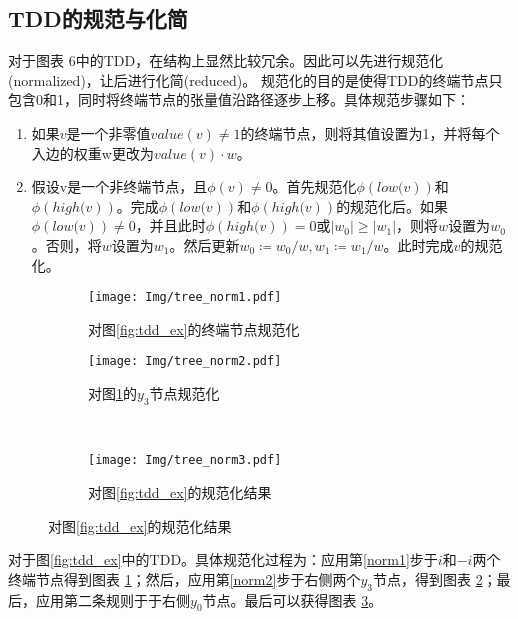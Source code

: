 \subsection{TDD的规范与化简}
对于图表 6中的TDD，在结构上显然比较冗余。因此可以先进行规范化(normalized)，让后进行化简(reduced)\citep{Hong_2022}。
规范化的目的是使得TDD的终端节点只包含0和1，同时将终端节点的张量值沿路径逐步上移。具体规范步骤如下：
\begin{enumerate}
    \item 如果$v$是一个非零值$value\left(v\right)\neq 1$的终端节点，则将其值设置为1，并将每个入边的权重w更改为$value\left(v\right)\cdot w$。\label{norm1}
    \item 假设v是一个非终端节点，且$\phi\left(v\right)\neq 0$。首先规范化$\phi\left.\left(low(v\right)\right)$和$\phi\left.\left(high(v\right)\right)$。完成$\phi\left.\left(low(v\right)\right)$和$\phi\left.\left(high(v\right)\right)$的规范化后。如果$\phi\left.\left(low(v\right)\right)\neq 0$，并且此时$\phi\left.\left(high(v\right)\right)=0$或$\left|w_0\right|\geq\left|w_1\right|$，则将$w$设置为$w_0$。否则，将$w$设置为$w_1$。然后更新$w_0≔w_0/w,w_1≔w_1/w$。此时完成$v$的规范化。\label{norm2}
\end{enumerate}

\begin{figure}[!htbp]
    \centering
    \begin{subfigure}[b]{0.4\textwidth}
        \centering
        \texttt{[image: Img/tree\_norm1.pdf]}
        \caption{对图\ref{fig:tdd_ex}的终端节点规范化}
        \label{fig:tdd-norma}
    \end{subfigure}
    \begin{subfigure}[b]{0.4\textwidth}
        \centering
        \texttt{[image: Img/tree\_norm2.pdf]}
        \caption{对图\ref{fig:tdd-norma}的$y_3$节点规范化}
        \label{fig:tdd-normb}
    \end{subfigure}
    \\
    \begin{subfigure}[b]{0.8\textwidth}
        \centering
        \texttt{[image: Img/tree\_norm3.pdf]}
        \caption{对图\ref{fig:tdd_ex}的规范化结果}
        \label{fig:tdd-normc}
    \end{subfigure}
    \label{fig:tdd-norm}
\end{figure}
对于图\ref{fig:tdd_ex}中的TDD。具体规范化过程为：应用第\ref{norm1}步于$i$和$-i$两个终端节点得到图表 \ref{fig:tdd-norma}；然后，应用第\ref{norm2}步于右侧两个$y_3$节点，得到图表 \ref{fig:tdd-normb}；最后，应用第二条规则于于右侧$y_0$节点。最后可以获得图表 \ref{fig:tdd-normc}。

